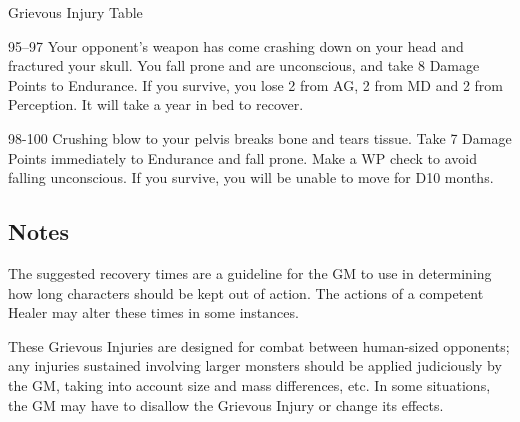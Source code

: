 \begin{Chapter}{Grievous Injury Table}
\begin{Description}
\item[95–97] Your opponent’s weapon has come crashing down on your
  head and fractured your skull. You fall prone and are unconscious,
  and take 8 Damage Points to Endurance.  If you survive, you lose 2
  from AG, 2 from MD and 2 from Perception. It will take a year in bed
  to recover.

\item[98-100] Crushing blow to your pelvis breaks bone and tears
  tissue. Take 7 Damage Points immediately to Endurance and fall
  prone.  Make a WP check to avoid falling unconscious. If you
  survive, you will be unable to move for D10 months.

\end{Description}

\subsection{Notes}

The suggested recovery times are a guideline for the GM to use in
determining how long characters should be kept out of action. The
actions of a competent Healer may alter these times in some instances.

These Grievous Injuries are designed for combat between human-sized
opponents; any injuries sustained involving larger monsters should be
applied judiciously by the GM, taking into account size and mass
differences, etc.  In some situations, the GM may have to disallow the
Grievous Injury or change its effects.

\end{Chapter}
